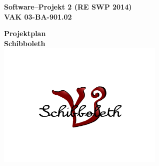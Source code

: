 \documentclass[fontsize=12pt,paper=a4,twoside]{scrartcl}
\begin{document}
  \thispagestyle{fancy}
  \fancyhead[LO,RE]{ }
  \fancyfoot[C]{}

  \vspace{3cm}

  \begin{minipage}[H]{\textwidth}
  \begin{center}
  \bf
  \Large
  Software--Projekt 2 (RE SWP 2014)\\
  \smallskip
  \small
  VAK 03-BA-901.02\\
  \vspace{3cm}
  
  \end{center}
  \end{minipage}
  \begin{minipage}[H]{\textwidth}
  \begin{center}
  \vspace{1cm}
  \bf
  \Large Projektplan\\ 
  \vspace{3ex}
  \small Schibboleth\\
  
 
\includegraphics[width=0.6\textwidth]{Logo.png}\\

 
  \vfill
  \end{center}
  
  \end{minipage}
  \vfill
\end{document}
